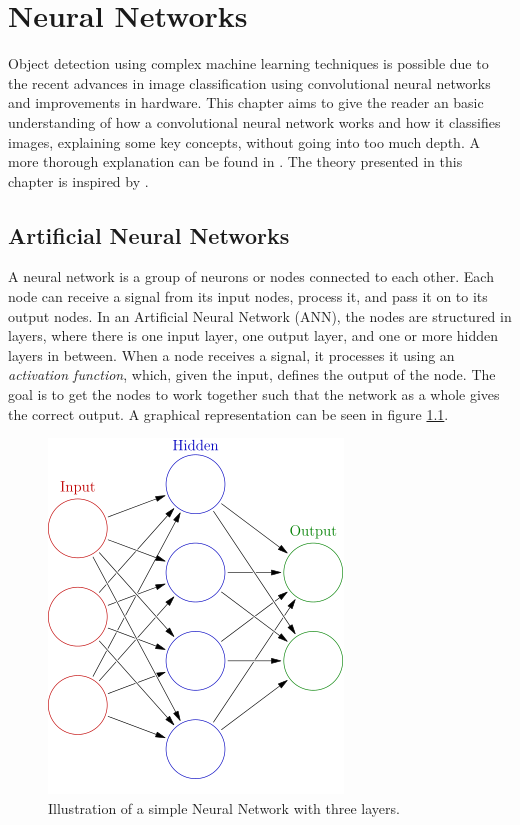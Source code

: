 
\chapter{Neural Networks}
Object detection using complex machine learning techniques is possible due to the recent advances in image classification using convolutional neural networks and improvements in hardware. This chapter aims to give the reader an basic understanding of how a convolutional neural network works and how it classifies images, explaining some key concepts, without going into too much depth. A more thorough explanation can be found in \citep{Krizhevsky2012}. The theory presented in this chapter is inspired by \citep{cnn_stanford}.

\section{Artificial Neural Networks}
A neural network is a group of neurons or nodes connected to each other. Each node can receive a signal from its input nodes, process it, and pass it on to its output nodes. In an Artificial Neural Network (ANN), the nodes are structured in layers, where there is one input layer, one output layer, and one or more hidden layers in between. When a node receives a signal, it processes it using an \textit{activation function}, which, given the input, defines the output of the node. The goal is to get the nodes to work together such that the network as a whole gives the correct output. A graphical representation can be seen in figure \ref{fig:NN}.

\begin{figure}
    \centering
    \includegraphics[scale=0.4]{fig/neural_network.png}
    \caption{Illustration of a simple Neural Network with three layers.}
    \label{fig:NN}
\end{figure}

